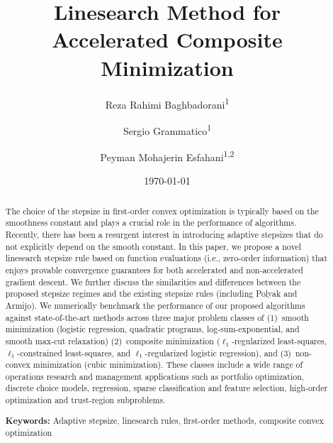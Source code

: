 \documentclass[11pt, a4paper, oneside, reqno]{amsart}
\date{\today}
\title[Linesearch Method for Accelerated Composite Minimization]{Linesearch Method for \\ Accelerated Composite Minimization}
\author[R. {Rahimi Baghbadorani}]{Reza {Rahimi Baghbadorani}\textsuperscript{1}}
\author[S. Grammatico]{Sergio Grammatico\textsuperscript{1}}
\author[P. {Mohajerin Esfahani}]{Peyman {Mohajerin Esfahani}\textsuperscript{1,2}}
\begin{document}
\maketitle


\begin{abstract}   
The choice of the stepsize in first-order convex optimization is typically based on the smoothness constant and plays a crucial role in the performance of algorithms. Recently, there has been a resurgent interest in introducing adaptive stepsizes that do not explicitly depend on the smooth constant. In this paper, we propose a novel linesearch stepsize rule based on function evaluations (i.e., zero-order information) that enjoys provable convergence guarantees for both accelerated and non-accelerated gradient descent. We further discuss the similarities and differences between the proposed stepsize regimes and the existing stepsize rules (including Polyak and Armijo). We numerically benchmark the performance of our proposed algorithms against state-of-the-art methods across three major problem classes of (1)~smooth minimization (logistic regression, quadratic programs, log-sum-exponential, and smooth max-cut relaxation) (2)~composite minimization ($\ell_1$-regularized least-squares, $\ell_1$-constrained least-squares, and $\ell_1$-regularized logistic regression), and (3)~non-convex minimization (cubic minimization). These classes include a wide range of operations research and management applications such as portfolio optimization, discrete choice models, regression, sparse classification and feature selection, high-order optimization and trust-region subproblems.

\noindent\textbf{Keywords:} Adaptive stepsize, linesearch rules, first-order methods, composite convex optimization 
\end{abstract}
\end{document}
